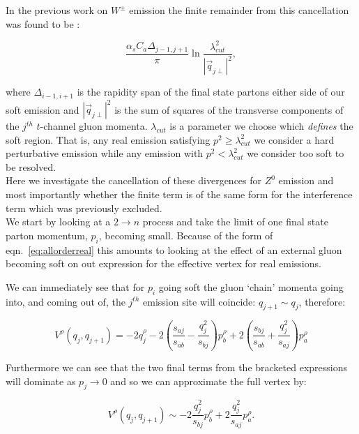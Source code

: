 		In the previous work on $W^\pm$ emission the finite remainder from this cancellation was found
		to be \cite{Andersen:2009nu, Andersen:2008gc}:

		\begin{equation}
			\frac{\alpha_s C_a \Delta_{j-1, j+1}}{\pi}\ln{\frac{\lambda_{cut}^2}{|\vec{q}_{j\perp}|^2}},
		\end{equation}

		where $\Delta_{i-1, i+1}$ is the rapidity span of the final state partons either side of our
		soft emission and $|\vec{q}_{j\perp}|^2$ is the sum of squares of the transverse components of
		the $j^{th}$ $t$-channel gluon momenta.  $\lambda_{cut}$ is a parameter we choose which \emph{defines}
		the soft region.  That is, any real emission satisfying $p^2 \geq \lambda_{cut}^2$ we consider a hard perturbative
		emission while any emission with $p^2 < \lambda_{cut}^2$ we consider too soft to be resolved.\\
		Here we investigate
		the cancellation of these divergences for $Z^0$ emission and most importantly whether the finite term
		is of the same form for the interference term which was previously excluded.\\We start by looking
		at a $2\rightarrow n$ process and take the limit of one final state parton momentum, $p_i$, becoming
		small.  Because of the form of eqn.~\eqref{eq:allorderreal} this amounts to looking at the
		effect of an external gluon becoming soft on out expression for the effective vertex for real emissions.

		We can immediately see that for $p_i$ going soft the gluon `chain' momenta going into,
		and coming out of, the $j^{th}$ emission site will coincide: $q_{j+1}\sim q_j$, therefore:

		\begin{equation}
			V^\rho(q_j, q_{j+1}) = -2q_j^\rho - 2\left(\frac{s_{aj}}{s_{ab}} -
				\frac{q^2_{j}}{s_{bj}}\right)p_b^\rho + 2\left(\frac{s_{bj}}{s_{ab}} +
				\frac{q_j^2}{s_{aj}}\right)p_a^\rho
				\label{eqn:vertexlimit}
		\end{equation}

		Furthermore we can see that the two final terms from the bracketed expressions will dominate
		as $p_j\to0$ and so we can approximate the full vertex by:

		\begin{equation}
			V^\rho(q_j, q_{j+1}) \sim -2\frac{q^2_{j}}{s_{bj}}p_b^\rho + 2\frac{q_j^2}{s_{aj}}p_a^\rho.
				\label{eqn:vertexlimit2}
		\end{equation}

